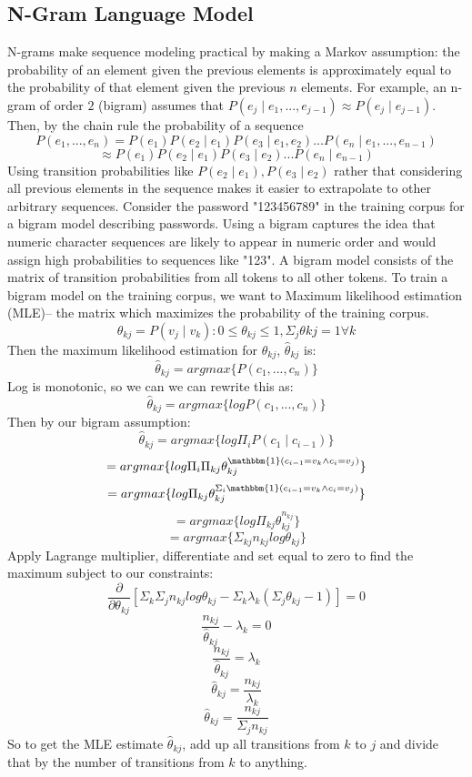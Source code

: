 \documentclass{amsart}
\theoremstyle{definition}
\theoremstyle{remark}
\numberwithin{equation}{section}
\begin{document}
\subsection{N-Gram Language Model}
N-grams make sequence modeling practical by making a Markov assumption: the probability of an element given the previous elements is approximately equal to the probability of that element given the previous $n$ elements. For example, an n-gram of order $2$ (bigram) assumes that $P(e_j \mid e_1, ..., e_{j - 1}) \approx P(e_j \mid e_{j - 1})$. Then, by the chain rule the probability of a sequence
$$P(e_1, ..., e_n) = P(e_1)P(e_2 \mid e_1)P(e_3 \mid e_1, e_2)...P(e_n \mid e_1, ..., e_{n - 1})$$
$$\approx P(e_1)P(e_2 \mid e_1)P(e_3 \mid e_2)...P(e_n \mid e_{n - 1})$$
Using transition probabilities like $P(e_2 \mid e_1), P(e_3 \mid e_2)$ rather that considering all previous elements in the sequence makes it easier to extrapolate to other arbitrary sequences. Consider the password "123456789" in the training corpus for a bigram model describing passwords. Using a bigram captures the idea that numeric character sequences are likely to appear in numeric order and would assign high probabilities to sequences like "123". A bigram model consists of the matrix of transition probabilities from all tokens to all other tokens. To train a bigram model on the training corpus, we want to Maximum likelihood estimation (MLE)-- the matrix which maximizes the probability of the training corpus.
$$\theta_{kj} = P(v_j \mid v_k) : 0 \leq \theta_{kj} \leq 1, \Sigma_j \theta{kj} = 1 \forall k$$
Then the maximum likelihood estimation for $\theta_{kj}$, $\hat{\theta}_{kj}$ is:
$$\hat{\theta}_{kj} = argmax\{P(c_1, ..., c_n)\}$$
Log is monotonic, so we can we can rewrite this as:
$$\hat{\theta}_{kj} = argmax\{log P(c_1, ..., c_n)\}$$
Then by our bigram assumption:
$$\hat{\theta}_{kj}= argmax\{log \Pi_i P(c_1 \mid c_{i - 1})\}$$
$$= argmax\{log \Pi_i \Pi_{kj} \theta_{kj}^{\mathbbm{1}(c_{i - 1} = v_k \land c_i = v_j)}\}$$
$$= argmax\{log \Pi_{kj} \theta_{kj}^{\Sigma_i \mathbbm{1}(c_{i - 1} = v_k \land c_i = v_j)}\}$$
$$= argmax\{log \Pi_{kj} \theta_{kj}^{n_{kj}}\}$$
$$= argmax\{\Sigma_{kj} n_{kj} log \theta_{kj}\}$$
Apply Lagrange multiplier, differentiate and set equal to zero to find the maximum subject to our constraints:
$$\frac{\partial}{\partial \theta_{kj}}[\Sigma_k \Sigma_j n_{kj} log \theta_{kj} - \Sigma_k \lambda_k (\Sigma_j \theta_{kj} - 1)] = 0$$
$$\frac{n_{kj}}{\hat{\theta}_{kj}} - \lambda_k = 0$$
$$\frac{n_{kj}}{\hat{\theta}_{kj}} = \lambda_k$$
$$\hat{\theta}_{kj} = \frac{n_{kj}}{\lambda_k}$$
$$\hat{\theta}_{kj} = \frac{n_{kj}}{\Sigma_j n_{kj}}$$
So to get the MLE estimate $\hat{\theta}_{kj}$, add up all transitions from $k$ to $j$ and divide that by the number of transitions from $k$ to anything.
\end{document}
